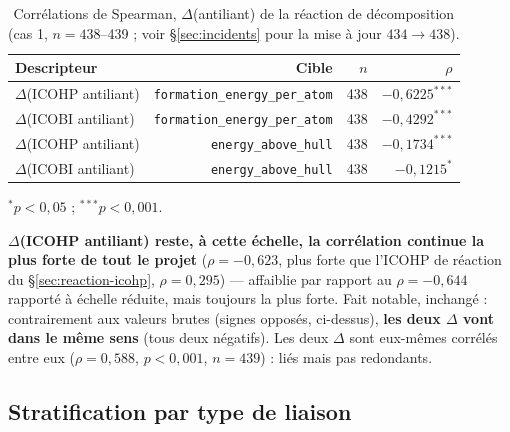 \documentclass[11pt,a4paper]{article}
\begin{document}
\begin{table}[htbp]
\centering
\caption{Corrélations de Spearman, $\Delta$(antiliant) de la réaction de décomposition (cas 1, $n=438$--439 ; voir \S\ref{sec:incidents} pour la mise à jour $434\to438$).}
\label{tab:delta-antibonding}
\begin{tabular}{@{}lrrr@{}}
\toprule
Descripteur & Cible & $n$ & $\rho$ \\
\midrule
$\Delta$(ICOHP antiliant) & \texttt{formation\_energy\_per\_atom} & 438 & $-0{,}6225^{***}$ \\
$\Delta$(ICOBI antiliant) & \texttt{formation\_energy\_per\_atom} & 438 & $-0{,}4292^{***}$ \\
$\Delta$(ICOHP antiliant) & \texttt{energy\_above\_hull} & 438 & $-0{,}1734^{***}$ \\
$\Delta$(ICOBI antiliant) & \texttt{energy\_above\_hull} & 438 & $-0{,}1215^{*}$ \\
\bottomrule
\end{tabular}

\vspace{0.15cm}
{\footnotesize $^{*}p<0{,}05$ ; $^{***}p<0{,}001$.}
\end{table}

\textbf{$\Delta$(ICOHP antiliant) reste, à cette échelle, la corrélation
continue la plus forte de tout le projet} ($\rho=-0{,}623$, plus forte
que l'ICOHP de réaction du \S\ref{sec:reaction-icohp}, $\rho=0{,}295$) ---
affaiblie par rapport au $\rho=-0{,}644$ rapporté à échelle réduite,
mais toujours la plus forte. Fait notable, inchangé : contrairement aux
valeurs brutes (signes opposés, ci-dessus), \textbf{les deux $\Delta$
vont dans le même sens} (tous deux négatifs). Les deux $\Delta$ sont
eux-mêmes corrélés entre eux ($\rho=0{,}588$, $p<0{,}001$, $n=439$) :
liés mais pas redondants.

\subsection{Stratification par type de liaison}
\end{document}
